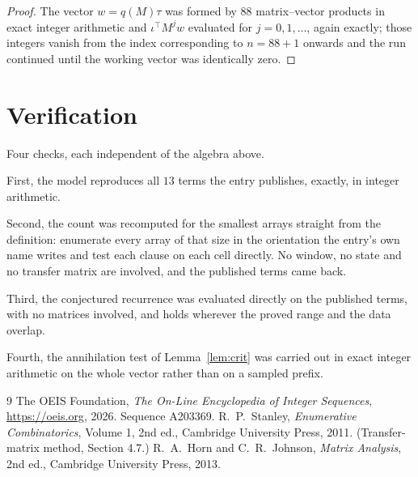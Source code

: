 \documentclass[11pt,a4paper]{article}
\theoremstyle{plain}
\theoremstyle{definition}
\begin{document}
\begin{proof}
The vector $w=q(M)\tau$ was formed by $88$ matrix--vector products in exact integer
arithmetic and $\iota^{\!\top}M^{j}w$ evaluated for $j=0,1,\dots$, again exactly; those
integers vanish from the index corresponding to $n=88+1$ onwards and the run continued
until the working vector was identically zero.
\end{proof}

\section{Verification}

Four checks, each independent of the algebra above.

First, the model reproduces all $13$ terms the entry publishes, exactly, in integer
arithmetic.

Second, the count was recomputed for the smallest arrays straight from the definition:
enumerate every array of that size in the orientation the entry's own name writes and test each
clause on each cell directly. No window, no state and no transfer matrix are involved, and the
published terms came back.

Third, the conjectured recurrence was evaluated directly on the published terms, with no
matrices involved, and holds wherever the proved range and the data overlap.

Fourth, the annihilation test of Lemma~\ref{lem:crit} was carried out in exact integer
arithmetic on the whole vector rather than on a sampled prefix.

\begin{thebibliography}{9}
 The OEIS Foundation, \emph{The On-Line Encyclopedia of Integer
Sequences}, \url{https://oeis.org}, 2026. Sequence A203369.
 R.~P.~Stanley, \emph{Enumerative Combinatorics}, Volume 1, 2nd ed.,
Cambridge University Press, 2011. (Transfer-matrix method, Section 4.7.)
 R.~A.~Horn and C.~R.~Johnson, \emph{Matrix Analysis}, 2nd ed., Cambridge
University Press, 2013.
\end{thebibliography}
\end{document}
